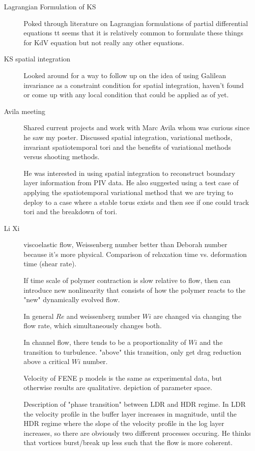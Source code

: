 \begin{description}
{\begin{description}
\item[Lagrangian Formulation of KS]
Poked through literature on Lagrangian formulations of partial differential
equations tt seems that it is relatively common to formulate these things for KdV equation
but not really any other equations.

\item[KS spatial integration]
Looked around for a way to follow up on the idea of using Galilean invariance as a
constraint condition for spatial integration, haven't found or come up with any local
condition that could be applied as of yet.

\item[Avila meeting]
Shared current projects and work with Marc Avila whom was curious since he saw
my poster. Discussed spatial integration, variational methods, invariant spatiotemporal
tori and the benefits of variational methods versus shooting methods.

He was interested in using spatial integration to reconstruct boundary layer information
from PIV data. He also suggested using a test case of applying the spatiotemporal
variational method that we are trying to deploy to a case where a stable torus exists and
then see if one could track tori and the breakdown of tori.

\item[Li Xi]
viscoelastic flow, Weissenberg number better than Deborah number because it's more physical.
Comparison of relaxation time vs. deformation time (shear rate).

If time scale of polymer contraction is slow relative to flow, then can introduce new
nonlinearity that consists of how the polymer reacts to the "new" dynamically evolved flow.

In general $Re$ and weissenberg number $Wi$ are changed via changing the flow rate, which
simultaneously changes both.

In channel flow, there tends to be a proportionality of $Wi$ and the transition to turbulence.
"above" this transition, only get drag reduction above a critical $Wi$ number.

Velocity of FENE p models is the same as experimental data, but otherwise results are qualitative.
depiction of parameter space.

Description of "phase transition" between LDR and HDR regime. In LDR the velocity profile
in the buffer layer increases in magnitude, until the HDR regime where the slope of the
velocity profile in the log layer increases, so there are obviously two different
processes occuring. He thinks that vortices burst/break up less such that the flow is more
coherent.


\end{description}}
\end{description}
